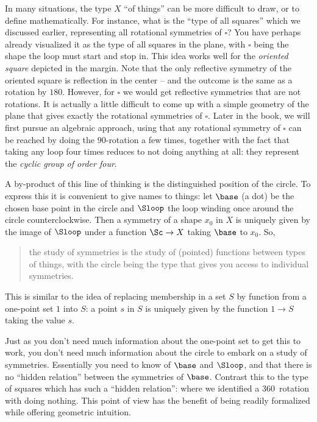 
In many situations, the type $X$ ``of things'' can be more difficult to draw,
or to define mathematically.  For instance, what is the ``type of all squares'' which we discussed earlier, representing all rotational symmetries of $\square$?  You have perhaps already visualized it as the type of all squares in the plane, with $\square$ being the shape the loop must start and stop in. This idea works well for the \emph{oriented square} depicted
in the margin. Note that the only reflective symmetry of the oriented
square is reflection in the center -- and the outcome is the same
as a rotation by $180$\textdegree. However, for $\square$ we would get
reflective symmetries that are not rotations.
It is actually a little difficult to come
up with a simple geometry of the plane that gives exactly the rotational
symmetries of $\square$. Later in the book, we will first pursue an
algebraic approach, using that any rotational symmetry of $\square$
can be reached by doing the $90$\textdegree-rotation a few times, 
together with the fact that taking any loop four times reduces to not doing
anything at all: they represent the \emph{cyclic group of order four}.

A by-product of this line of thinking is the distinguished position of the circle. To express this it is convenient to give names to things: let $\base$ (\ie a dot) be the chosen base point in the circle and $\Sloop$ the loop winding once around the circle counterclockwise. Then a symmetry of a shape $x_0$ in $X$ is uniquely given by the image of $\Sloop $ under a function $\Sc\to X$ taking $\base$ to $x_0$. So,
\begin{quote}
  the study of symmetries is the study of (pointed) functions between types of things, with the circle being the type that gives you access to individual symmetries.
\end{quote}

This is similar to the idea of replacing membership in a set $S$ by function from a one-point set $1$ into $S$: a point $s$ in $S$ is uniquely given by the function $1\to S$ taking the value $s$.


Just as you don't need much information about the one-point set to get this to work, you don't need much information about the circle to embark on a study of symmetries.
Essentially you need to know of $\base $ and $\Sloop $, and that there is no ``hidden relation'' between the symmetries of $\base$. Contrast this to the type of squares which has such a ``hidden relation'': where we identified a $360$\textdegree\ rotation with doing nothing.  This point of view has the benefit of being readily formalized while offering geometric intuition.

